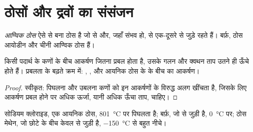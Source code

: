 \section{ठोसों और द्रवों का संसंजन}

\begin{definition}[आण्विक ठोस]\label{def:g11:polarity-and-cohesion:molecular-solid}
\emph{आण्विक ठोस} ऐसे  से बना ठोस है जो
 से और, जहाँ संभव हो,  से
एक-दूसरे से जुड़े रहते हैं। बर्फ़, ठोस आयोडीन और चीनी आण्विक
ठोस हैं।
\end{definition}

\begin{proposition}[संसंजन और अवस्था-परिवर्तन]\label{prop:g11:polarity-and-cohesion:cohesion}
किसी पदार्थ के कणों के बीच आकर्षण जितना प्रबल होता है, उसके गलन और क्वथन ताप
उतने ही ऊँचे होते हैं। प्रबलता के बढ़ते क्रम में:
, , और आयनिक ठोस के  के बीच
का आकर्षण।
\end{proposition}

\begin{proof}
स्वीकृत: पिघलना और उबलना कणों को इन आकर्षणों के विरुद्ध अलग खींचता है,
जिसके लिए आकर्षण प्रबल होने पर अधिक ऊर्जा, यानी अधिक ऊँचा ताप,
चाहिए।
\end{proof}

\begin{example}[तीन ठोस]\label{ex:g11:polarity-and-cohesion:three}
सोडियम क्लोराइड, एक आयनिक ठोस, \qty{801}{\celsius} पर पिघलता है; बर्फ़, जो
 से जुड़ी है, \qty{0}{\celsius} पर; ठोस मेथेन, जो छोटे  के बीच
केवल  से जुड़ी है,
\qty{-150}{\celsius} से बहुत नीचे।
\end{example}

